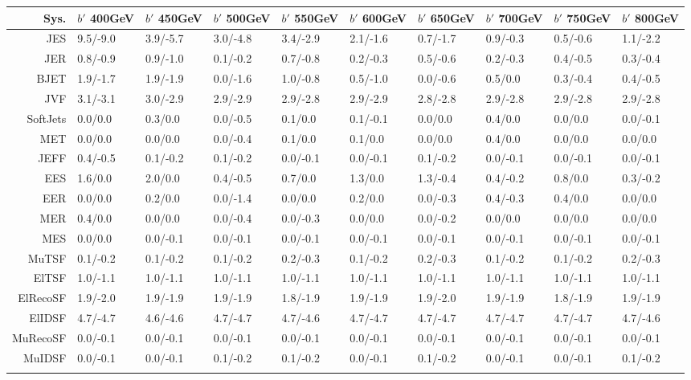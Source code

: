 \begin{tabular}{r|p{.06\linewidth}p{.06\linewidth}p{.06\linewidth}p{.06\linewidth}p{.06\linewidth}p{.06\linewidth}p{.06\linewidth}p{.06\linewidth}p{.06\linewidth}}
\toprule
 Sys.  & $b'$ 400GeV & $b'$ 450GeV & $b'$ 500GeV & $b'$ 550GeV & $b'$ 600GeV & $b'$ 650GeV & $b'$ 700GeV & $b'$ 750GeV & $b'$ 800GeV \\
\toprule
JES  & 9.5/-9.0 & 3.9/-5.7 & 3.0/-4.8 & 3.4/-2.9 & 2.1/-1.6 & 0.7/-1.7 & 0.9/-0.3 & 0.5/-0.6 & 1.1/-2.2 \\
JER  & 0.8/-0.9 & 0.9/-1.0 & 0.1/-0.2 & 0.7/-0.8 & 0.2/-0.3 & 0.5/-0.6 & 0.2/-0.3 & 0.4/-0.5 & 0.3/-0.4 \\
BJET  & 1.9/-1.7 & 1.9/-1.9 & 0.0/-1.6 & 1.0/-0.8 & 0.5/-1.0 & 0.0/-0.6 & 0.5/0.0 & 0.3/-0.4 & 0.4/-0.5 \\
JVF  & 3.1/-3.1 & 3.0/-2.9 & 2.9/-2.9 & 2.9/-2.8 & 2.9/-2.9 & 2.8/-2.8 & 2.9/-2.8 & 2.9/-2.8 & 2.9/-2.8 \\
SoftJets  & 0.0/0.0 & 0.3/0.0 & 0.0/-0.5 & 0.1/0.0 & 0.1/-0.1 & 0.0/0.0 & 0.4/0.0 & 0.0/0.0 & 0.0/-0.1 \\
MET  & 0.0/0.0 & 0.0/0.0 & 0.0/-0.4 & 0.1/0.0 & 0.1/0.0 & 0.0/0.0 & 0.4/0.0 & 0.0/0.0 & 0.0/0.0 \\
JEFF  & 0.4/-0.5 & 0.1/-0.2 & 0.1/-0.2 & 0.0/-0.1 & 0.0/-0.1 & 0.1/-0.2 & 0.0/-0.1 & 0.0/-0.1 & 0.0/-0.1 \\
EES  & 1.6/0.0 & 2.0/0.0 & 0.4/-0.5 & 0.7/0.0 & 1.3/0.0 & 1.3/-0.4 & 0.4/-0.2 & 0.8/0.0 & 0.3/-0.2 \\
EER  & 0.0/0.0 & 0.2/0.0 & 0.0/-1.4 & 0.0/0.0 & 0.2/0.0 & 0.0/-0.3 & 0.4/-0.3 & 0.4/0.0 & 0.0/0.0 \\
MER  & 0.4/0.0 & 0.0/0.0 & 0.0/-0.4 & 0.0/-0.3 & 0.0/0.0 & 0.0/-0.2 & 0.0/0.0 & 0.0/0.0 & 0.0/0.0 \\
MES  & 0.0/0.0 & 0.0/-0.1 & 0.0/-0.1 & 0.0/-0.1 & 0.0/-0.1 & 0.0/-0.1 & 0.0/-0.1 & 0.0/-0.1 & 0.0/-0.1 \\
MuTSF  & 0.1/-0.2 & 0.1/-0.2 & 0.1/-0.2 & 0.2/-0.3 & 0.1/-0.2 & 0.2/-0.3 & 0.1/-0.2 & 0.1/-0.2 & 0.2/-0.3 \\
ElTSF  & 1.0/-1.1 & 1.0/-1.1 & 1.0/-1.1 & 1.0/-1.1 & 1.0/-1.1 & 1.0/-1.1 & 1.0/-1.1 & 1.0/-1.1 & 1.0/-1.1 \\
ElRecoSF  & 1.9/-2.0 & 1.9/-1.9 & 1.9/-1.9 & 1.8/-1.9 & 1.9/-1.9 & 1.9/-2.0 & 1.9/-1.9 & 1.8/-1.9 & 1.9/-1.9 \\
ElIDSF  & 4.7/-4.7 & 4.6/-4.6 & 4.7/-4.7 & 4.7/-4.6 & 4.7/-4.7 & 4.7/-4.7 & 4.7/-4.7 & 4.7/-4.7 & 4.7/-4.6 \\
MuRecoSF  & 0.0/-0.1 & 0.0/-0.1 & 0.0/-0.1 & 0.0/-0.1 & 0.0/-0.1 & 0.0/-0.1 & 0.0/-0.1 & 0.0/-0.1 & 0.0/-0.1 \\
MuIDSF  & 0.0/-0.1 & 0.0/-0.1 & 0.1/-0.2 & 0.1/-0.2 & 0.0/-0.1 & 0.1/-0.2 & 0.0/-0.1 & 0.0/-0.1 & 0.1/-0.2 \\
 \\
\bottomrule
\end{tabular}
